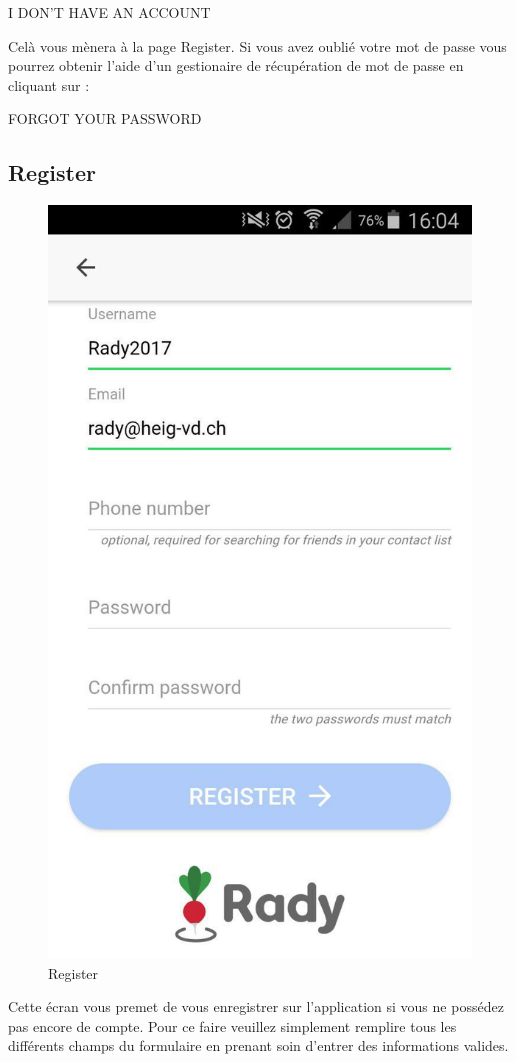 \documentclass[french]{article}
\begin{document}
	\centering
	I DON'T HAVE AN ACCOUNT
	
	\bigskip
	\justifying 
	Celà vous mènera à la page Register.
	\newline
	Si vous avez oublié votre mot de passe vous pourrez obtenir l'aide d'un gestionaire de récupération de mot de passe en cliquant sur :
	\bigskip
	
	\centering
	FORGOT YOUR PASSWORD
	
	\bigskip
	\justifying 
	\subsection{Register}
	\begin{figure}[H]
		\centering
		\includegraphics[scale=0.4]{../screenshot/screenshot-register2}
		\caption{Register}
		\label{Register}
	\end{figure} 
	Cette écran vous premet de vous enregistrer sur l'application si vous ne possédez pas encore de compte. Pour ce faire veuillez simplement remplire tous les différents champs du formulaire en prenant soin d'entrer des informations valides.
	
\end{document}
